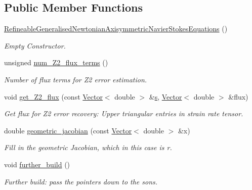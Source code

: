 \subsection*{Public Member Functions}
\begin{DoxyCompactItemize}
\item 
\hyperlink{classoomph_1_1RefineableGeneralisedNewtonianAxisymmetricNavierStokesEquations_aeba8d789310fc20760e6af2d580edd65}{Refineable\+Generalised\+Newtonian\+Axisymmetric\+Navier\+Stokes\+Equations} ()
\begin{DoxyCompactList}\small\item\em Empty Constructor. \end{DoxyCompactList}\item 
unsigned \hyperlink{classoomph_1_1RefineableGeneralisedNewtonianAxisymmetricNavierStokesEquations_aa0085413944f5d84578ae28f57d7f4fc}{num\+\_\+\+Z2\+\_\+flux\+\_\+terms} ()
\begin{DoxyCompactList}\small\item\em Number of \textquotesingle{}flux\textquotesingle{} terms for Z2 error estimation. \end{DoxyCompactList}\item 
void \hyperlink{classoomph_1_1RefineableGeneralisedNewtonianAxisymmetricNavierStokesEquations_a6858f80eb16799bc4bfc844e0e297432}{get\+\_\+\+Z2\+\_\+flux} (const \hyperlink{classoomph_1_1Vector}{Vector}$<$ double $>$ \&\hyperlink{cfortran_8h_ab7123126e4885ef647dd9c6e3807a21c}{s}, \hyperlink{classoomph_1_1Vector}{Vector}$<$ double $>$ \&flux)
\begin{DoxyCompactList}\small\item\em Get \textquotesingle{}flux\textquotesingle{} for Z2 error recovery\+: Upper triangular entries in strain rate tensor. \end{DoxyCompactList}\item 
double \hyperlink{classoomph_1_1RefineableGeneralisedNewtonianAxisymmetricNavierStokesEquations_a1079d819a74edb3a620dc01061168950}{geometric\+\_\+jacobian} (const \hyperlink{classoomph_1_1Vector}{Vector}$<$ double $>$ \&x)
\begin{DoxyCompactList}\small\item\em Fill in the geometric Jacobian, which in this case is r. \end{DoxyCompactList}\item 
void \hyperlink{classoomph_1_1RefineableGeneralisedNewtonianAxisymmetricNavierStokesEquations_af800c46aa82a7188565d68df5aee6fa0}{further\+\_\+build} ()
\begin{DoxyCompactList}\small\item\em Further build\+: pass the pointers down to the sons. \end{DoxyCompactList}\item 

\end{DoxyCompactItemize}
